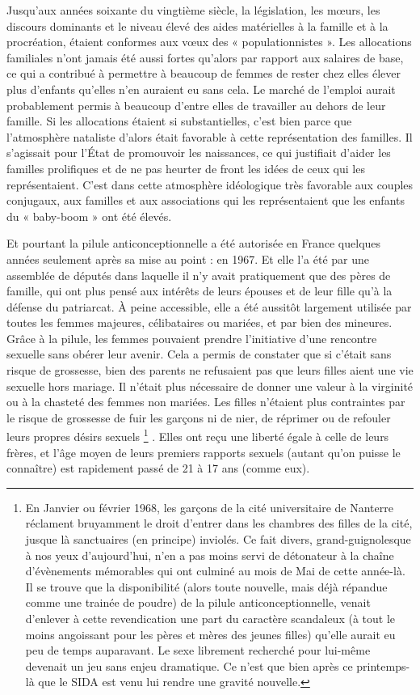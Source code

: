  Jusqu'aux années soixante du vingtième siècle, la législation, les mœurs, les discours dominants et le niveau élevé des aides matérielles à la famille et à la procréation, étaient conformes aux vœux des « populationnistes ». Les allocations familiales n'ont jamais été aussi fortes qu'alors par rapport aux salaires de base, ce qui a contribué à permettre à beaucoup de femmes de rester chez elles élever plus d'enfants qu'elles n'en auraient eu sans cela. Le marché de l'emploi aurait probablement permis à beaucoup d'entre elles de travailler au dehors de leur famille. Si les allocations étaient si substantielles, c'est bien parce que l'atmosphère nataliste d'alors était favorable à cette représentation des familles. Il s'agissait pour l'État de promouvoir les naissances, ce qui justifiait d'aider les familles prolifiques et de ne pas heurter de front les idées de ceux qui les représentaient. C'est dans cette atmosphère idéologique très favorable aux couples conjugaux, aux familles et aux associations qui les représentaient que les enfants du « baby-boom » ont été élevés. 

 Et pourtant la pilule anticonceptionnelle a été autorisée en France quelques années seulement après sa mise au point : en 1967. Et elle l'a été par une assemblée de députés dans laquelle il n'y avait pratiquement que des pères de famille, qui ont plus pensé aux intérêts de leurs épouses et de leur fille qu'à la défense du patriarcat. À peine accessible, elle a été aussitôt largement utilisée par toutes les femmes majeures, célibataires ou mariées, et par bien des mineures. Grâce à la pilule, les femmes pouvaient prendre l'initiative d'une rencontre sexuelle sans obérer leur avenir. Cela a permis de constater que si c'était sans risque de grossesse, bien des parents ne refusaient pas que leurs filles aient une vie sexuelle hors mariage. Il n'était plus nécessaire de donner une valeur à la virginité ou à la chasteté des femmes non mariées. Les filles n'étaient plus contraintes par le risque de grossesse de fuir les garçons ni de nier, de réprimer ou de refouler leurs propres désirs sexuels
\footnote{En Janvier ou février 1968, les garçons de la cité universitaire de Nanterre réclament bruyamment le droit d'entrer dans les chambres des filles de la cité, jusque là sanctuaires (en principe) inviolés. Ce fait divers, grand-guignolesque à nos yeux d'aujourd'hui, n'en a pas moins servi de détonateur à la chaîne d'évènements mémorables qui ont culminé au mois de Mai de cette année-là. Il se trouve que la disponibilité (alors toute nouvelle, mais déjà répandue comme une trainée de poudre) de la pilule anticonceptionnelle, venait d'enlever à cette revendication une part du caractère scandaleux (à tout le moins angoissant pour les pères et mères des jeunes filles) qu'elle aurait eu peu de temps auparavant. Le sexe librement recherché pour lui-même devenait un jeu sans enjeu dramatique. Ce n'est que bien après ce printemps-là que le SIDA est venu lui rendre une gravité nouvelle.}%
. Elles ont reçu une liberté égale à celle de leurs frères, et l'âge moyen de leurs premiers rapports sexuels (autant qu'on puisse le connaître) est rapidement passé de 21 à 17 ans (comme eux).

